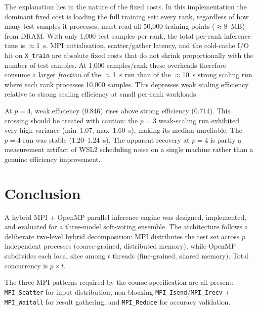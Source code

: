 \documentclass[12pt,a4paper]{article}
\begin{document}
The explanation lies in the nature of the fixed costs. In this implementation
the dominant fixed cost is loading the full training set: every rank, regardless
of how many test samples it processes, must read all 50{,}000 training points
($\approx$8~MB) from DRAM. With only 1{,}000 test samples per rank, the total
per-rank inference time is $\approx$1~s. MPI initialisation, scatter/gather
latency, and the cold-cache I/O hit on \texttt{X\_train} are absolute fixed
costs that do not shrink proportionally with the number of test samples.
At 1{,}000 samples/rank these overheads therefore consume a larger
\emph{fraction} of the $\approx$1~s run than of the $\approx$10~s strong
scaling run where each rank processes 10{,}000 samples. This depresses weak
scaling efficiency relative to strong scaling efficiency at small per-rank
workloads.

At $p=4$, weak efficiency (0.846) rises above strong efficiency (0.714).
This crossing should be treated with caution: the $p=3$ weak-scaling run
exhibited very high variance (min~1.07, max~1.60~s), making its median
unreliable. The $p=4$ run was stable (1.20--1.24~s). The apparent
recovery at $p=4$ is partly a measurement artifact of WSL2 scheduling noise
on a single machine rather than a genuine efficiency improvement.

\section{Conclusion}

A hybrid MPI + OpenMP parallel inference engine was designed, implemented,
and evaluated for a three-model soft-voting ensemble.
The architecture follows a deliberate two-level hybrid decomposition: MPI
distributes the test set across $p$ independent processes (coarse-grained,
distributed memory), while OpenMP subdivides each local slice among $t$
threads (fine-grained, shared memory). Total concurrency is $p \times t$.

The three MPI patterns required by the course specification are all present:
\texttt{MPI\_Scatter} for input distribution, non-blocking
\texttt{MPI\_Isend}/\texttt{MPI\_Irecv} + \texttt{MPI\_Waitall} for result
gathering, and \texttt{MPI\_Reduce} for accuracy validation.
\end{document}
